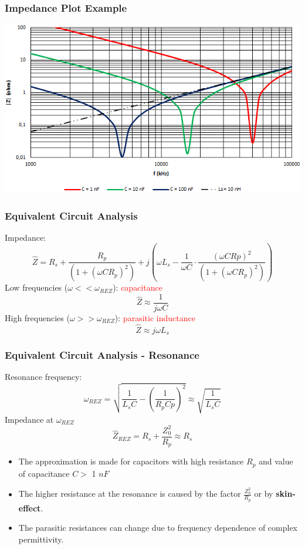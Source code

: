 \documentclass{beamer}
\begin{document}
	\begin{frame}
    \frametitle{Impedance Plot Example}

		\begin{center}
			\includegraphics[scale=0.62]{obr03_impedanceC.png}
		\end{center}
	\end{frame}
	\begin{frame}
    \frametitle{Equivalent Circuit Analysis}
		Impedance: 
		$$\hat{Z}= R_s+\frac{R_p}{\left(1+(\omega C R_p)^2\right)} + j\left(\omega L_s -\frac{1}{\omega C} \cdot \frac{(\omega C Rp)^2}{\left(1+(\omega C R_p)^2\right)}\right)$$
		Low frequencies ($\omega << \omega_{REZ}$): \textcolor{red}{capacitance}
		$$\hat{Z}\approx \frac{1}{j\omega C}$$
		High frequencies ($\omega >> \omega_{REZ}$): \textcolor{red}{parasitic inductance}
		$$\hat{Z}\approx j\omega L_s$$
	\end{frame}
	\begin{frame}
    \frametitle{Equivalent Circuit Analysis - Resonance}
		Resonance frequency:
		$$\omega_{REZ}= \sqrt{\frac{1}{L_sC} - \left(\frac{1}{R_pCp}\right)^2}\approx \sqrt{\frac{1}{L_sC}}$$
		Impedance at $\omega_{REZ}$
		$$\hat{Z}_{REZ}=R_s + \frac{Z_0^2}{R_p}\approx R_s$$
		\small
		\begin{itemize}
			\item The approximation is made for capacitors with high resistance $R_p$ and value of capacitance $C>$ 1 $nF$
			\item The higher resistance at the resonance is caused by the factor $\frac{Z_0^2}{R_p}$ or by \textbf{skin-effect}. 
			\item The parasitic resistances can change due to frequency dependence of complex permittivity.
		\end{itemize}
	\end{frame}
\end{document}
